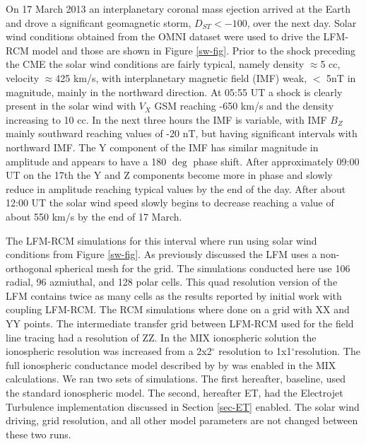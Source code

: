 \documentclass[draft,jgrga]{agutex}
\begin{document}
\begin{article}
On 17 March 2013 an interplanetary coronal mass ejection arrived at the Earth and drove a significant geomagnetic storm, $D_{ST} < -100$, over the next day.  Solar wind conditions obtained from the OMNI dataset were used to drive the LFM-RCM model and those are shown in Figure \ref{sw-fig}.  Prior to the shock preceding the CME the solar wind conditions are fairly typical, namely density $\approx$5 cc, velocity $\approx$425 km/s, with interplanetary magnetic field (IMF) weak, $<$ 5nT in magnitude, mainly in the northward direction.  At 05:55 UT a shock is clearly present in the solar wind with $V_X$ GSM reaching -650 km/s and the density increasing to 10 cc.  In the next three hours the IMF is variable, with IMF $B_Z$ mainly southward reaching values of -20 nT, but having significant intervals with northward IMF.  The Y component of the IMF has similar magnitude in amplitude and appears to have a 180 $\deg$ phase shift.  After approximately  09:00 UT on the 17th the Y and Z components become more in phase and slowly reduce in amplitude reaching typical values by the end of the day.  After about 12:00 UT the solar wind speed slowly begins to decrease reaching a value of about 550 km/s by the end of 17 March.

The LFM-RCM simulations for this interval where run using solar wind conditions from Figure \ref{sw-fig}.  As previously discussed the LFM uses a non-orthogonal spherical mesh for the grid.  The simulations conducted here use 106 radial, 96 azmiuthal, and 128 polar cells.  This quad resolution version of the LFM contains twice as many cells as the results reported by \cite{Pembroke:2012gc} initial work with coupling LFM-RCM.   The RCM simulations where done on a grid with XX and YY points.  The intermediate transfer grid between LFM-RCM used for the field line tracing had a resolution of ZZ.  In the MIX ionospheric solution the ionospheric resolution was increased from a 2x2$^{\circ}$ resolution to 1x1$^{\circ}$resolution.  The full ionospheric conductance model described by \cite{2009JGRA..11401204W} by was enabled in the MIX calculations.  We ran two sets of simulations.  The first hereafter, baseline, used the standard ionospheric model.  The second, hereafter ET, had the Electrojet Turbulence implementation discussed in Section \ref{sec-ET} enabled.  The solar wind driving, grid resolution, and all other model parameters are not changed between these two runs. 


\end{article}
\end{document}
